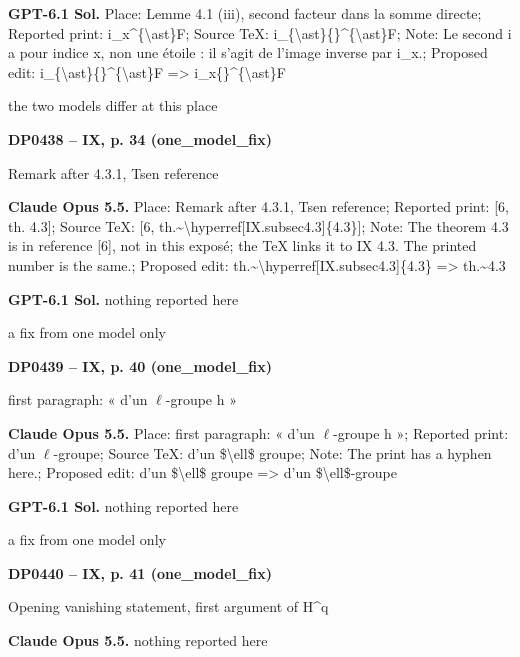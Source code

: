 \textbf{GPT-6.1 Sol.} Place: Lemme 4.1 (iii), second facteur dans la somme directe; Reported print: i\_x\textasciicircum{}\{\textbackslash{}ast\}F; Source TeX: i\_\{\textbackslash{}ast\}\{\}\textasciicircum{}\{\textbackslash{}ast\}F; Note: Le second i a pour indice x, non une étoile : il s'agit de l'image inverse par i\_x.; Proposed edit: i\_\{\textbackslash{}ast\}\{\}\textasciicircum{}\{\textbackslash{}ast\}F =\allowbreak > i\_x\{\}\textasciicircum{}\{\textbackslash{}ast\}F\par
the two models differ at this place\par
\par\noindent\hypertarget{DP0438}{}\textbf{DP0438 -- IX, p. 34 (one\_model\_fix)}\par
Remark after 4.3.1, Tsen reference\par
\textbf{Claude Opus 5.5.} Place: Remark after 4.3.1, Tsen reference; Reported print: [6, th. 4.3]; Source TeX: [6, th.\textasciitilde{}\textbackslash{}hyperref[IX.subsec4.3]\{4.3\}]; Note: The theorem 4.3 is in reference [6], not in this exposé; the TeX links it to IX 4.3. The printed number is the same.; Proposed edit: th.\textasciitilde{}\textbackslash{}hyperref[IX.subsec4.3]\{4.3\} =\allowbreak > th.\textasciitilde{}4.3\par
\textbf{GPT-6.1 Sol.} nothing reported here\par
a fix from one model only\par
\par\noindent\hypertarget{DP0439}{}\textbf{DP0439 -- IX, p. 40 (one\_model\_fix)}\par
first paragraph: « d'un \ensuremath{\ell}-groupe h »\par
\textbf{Claude Opus 5.5.} Place: first paragraph: « d'un \ensuremath{\ell}-groupe h »; Reported print: d'un \ensuremath{\ell}-groupe; Source TeX: d'un \$\textbackslash{}ell\$ groupe; Note: The print has a hyphen here.; Proposed edit: d'un \$\textbackslash{}ell\$ groupe =\allowbreak > d'un \$\textbackslash{}ell\$-groupe\par
\textbf{GPT-6.1 Sol.} nothing reported here\par
a fix from one model only\par
\par\noindent\hypertarget{DP0440}{}\textbf{DP0440 -- IX, p. 41 (one\_model\_fix)}\par
Opening vanishing statement, first argument of H\textasciicircum{}q\par
\textbf{Claude Opus 5.5.} nothing reported here\par
